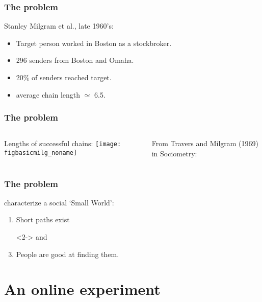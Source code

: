 \begin{frame}
  \frametitle{The problem}

  \begin{block}{Stanley Milgram et al., late 1960's:}
    \begin{itemize}
    \item Target person worked in Boston as a stockbroker.
    \item 296 senders from Boston and Omaha.
    \item 20\% of senders reached target.
    \item average chain length $\simeq$ 6.5.
    \end{itemize}
  \end{block}

\end{frame}

\begin{frame}
   \frametitle{The problem}

   \begin{columns}
     \begin{block}{Lengths of successful chains:}
       \texttt{[image: figbasicmilg\_noname]}
     \end{block}
     From Travers and Milgram (1969) in Sociometry:\cite{travers1969a}\\
   \end{columns}

\end{frame}

\begin{frame}
  \frametitle{The problem}

  characterize a social `Small World':

  \begin{enumerate}
  \item<2-> Short paths exist
  \item[]<2-> and 
  \item<3-> People are good at finding them.
  \end{enumerate}

\end{frame}

\section{An online experiment}


